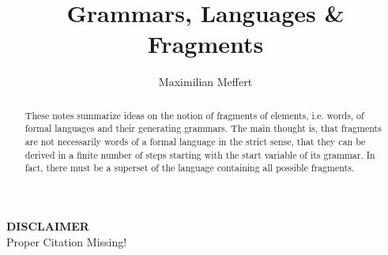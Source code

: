 \documentclass[runningheads,a4paper]{llncs}
\title{Grammars, Languages \& Fragments}
\author{Maximilian Meffert}
\institute{}
\begin{document}
\maketitle

\begin{center}
\textbf{DISCLAIMER}
\\Proper Citation Missing!
\end{center}

\begin{abstract}
These notes summarize ideas on the notion of fragments of elements, i.e. words, of formal languages and their generating grammars.
The main thought is, that fragments are not necessarily words of a formal language in the strict sense, that they can be derived in a finite number of steps starting with the start variable of its grammar.
In fact, there must be a superset of the language containing all possible fragments.
\end{abstract}
\end{document}
